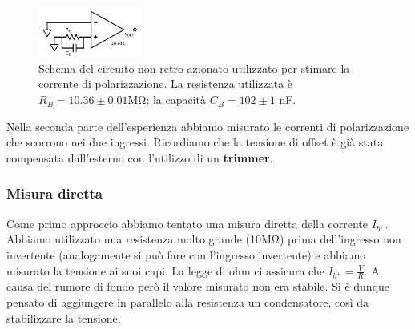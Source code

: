 \begin{figure}
  \begin{center}
    \includegraphics[width=0.30\textwidth]{../E02/latex/direct_measure.pdf}
  \end{center}
  \caption{Schema del circuito non retro-azionato utilizzato per stimare la corrente di polarizzazione. La resistenza utilizzata è $R_B=10.36\pm0.01$\si{\mega\ohm}; la capacità $C_B=102 \pm 1$ \si{\nano\farad}.}
  \label{circuito:rel2_correnti_senzaretroazione}
\end{figure}


Nella seconda parte dell'esperienza abbiamo misurato le correnti di polarizzazione che scorrono nei due ingressi. Ricordiamo che la tensione di offset è già stata compensata dall'esterno con l'utilizzo di un \textbf{trimmer}. 

\subsubsection{Misura diretta}





Come primo approccio abbiamo tentato una misura diretta della corrente $I_{b^+}$.
Abbiamo utilizzato una resistenza molto grande (10\si{\mega\ohm}) prima dell'ingresso non invertente (analogamente si può fare con l'ingresso invertente) e abbiamo misurato la tensione ai suoi capi. La legge di ohm ci assicura che $I_{b^+}=\frac{V}{R}$. A causa del rumore di fondo però il valore misurato non era stabile. Si è dunque pensato di aggiungere in parallelo alla resistenza un condensatore, così da stabilizzare la tensione.






